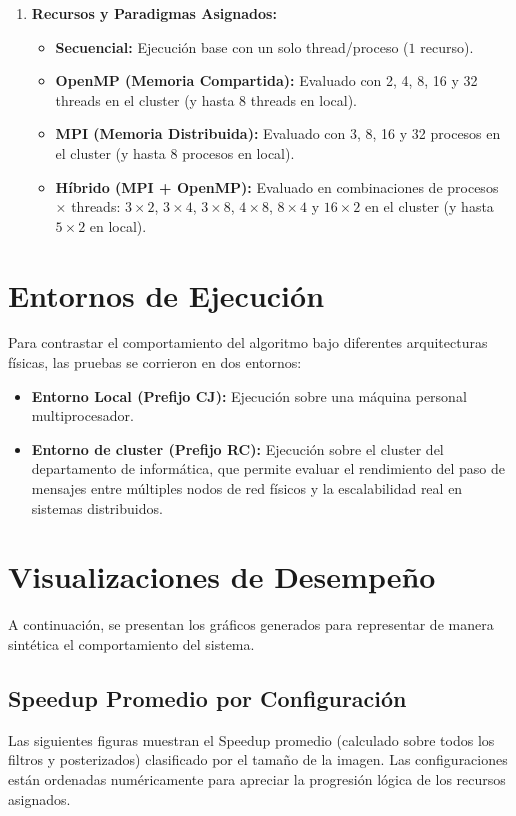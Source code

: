 \begin{enumerate}
    \item \textbf{Recursos y Paradigmas Asignados:}
    \begin{itemize}
        \item \textbf{Secuencial:} Ejecución base con un solo thread/proceso ($1$ recurso).
        \item \textbf{OpenMP (Memoria Compartida):} Evaluado con 2, 4, 8, 16 y 32 threads en el cluster (y hasta 8 threads en local).
        \item \textbf{MPI (Memoria Distribuida):} Evaluado con 3, 8, 16 y 32 procesos en el cluster (y hasta 8 procesos en local).
        \item \textbf{Híbrido (MPI + OpenMP):} Evaluado en combinaciones de procesos $\times$ threads: $3\times2$, $3\times4$, 
        $3\times8$, $4\times8$, $8\times4$ y $16\times2$ en el cluster (y hasta $5\times2$ en local).
    \end{itemize}
\end{enumerate}

\section{Entornos de Ejecución}

Para contrastar el comportamiento del algoritmo bajo diferentes arquitecturas físicas, las pruebas se corrieron en dos entornos:
\begin{itemize}
    \item \textbf{Entorno Local (Prefijo CJ):} Ejecución sobre una máquina personal multiprocesador.
    \item \textbf{Entorno de cluster (Prefijo RC):} Ejecución sobre el cluster del departamento de informática, que permite evaluar el 
    rendimiento del paso de mensajes entre múltiples nodos de red físicos y la escalabilidad real en sistemas distribuidos.
\end{itemize}

\section{Visualizaciones de Desempeño}

A continuación, se presentan los gráficos generados para representar de manera sintética el comportamiento del sistema.

\subsection{Speedup Promedio por Configuración}
Las siguientes figuras muestran el Speedup promedio (calculado sobre todos los filtros y posterizados) clasificado por el tamaño de la imagen. 
Las configuraciones están ordenadas numéricamente para apreciar la progresión lógica de los recursos asignados.

